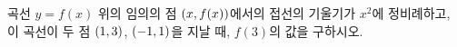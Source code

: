 곡선 $y=f(x)$ 위의 임의의 점 $(x{,}\mkern3mu\mathopen{}f(x))$에서의 접선의 기울기가 $x^2$에 정비례하고, 이 곡선이 두 점 $(1{,}\mkern3mu\mathopen{}3)$, $(-1{,}\mkern3mu\mathopen{}1)$을 지날 때, $f(3)$의 값을 구하시오.

